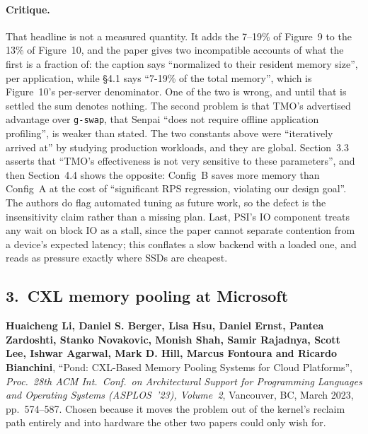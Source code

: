 \paragraph{Critique.}
That headline is not a measured quantity. It adds the 7--19\% of Figure~9 to the 13\% of
Figure~10, and the paper gives two incompatible accounts of what the first is a fraction
of: the caption says ``normalized to their resident memory size'', per application, while
\S4.1 says ``7-19\% of the total memory'', which is Figure~10's per-server denominator.
One of the two is wrong, and until that is settled the sum denotes nothing. The second problem is that TMO's advertised
advantage over \texttt{g-swap}, that Senpai ``does not require offline application
profiling'', is weaker than stated. The two constants above were ``iteratively arrived
at'' by studying production workloads, and they are global. Section~3.3 asserts that
``TMO's effectiveness is not very sensitive to these parameters'', and then Section~4.4
shows the opposite: Config~B saves more memory than Config~A at the cost of
``significant RPS regression, violating our design goal''. The authors do flag automated
tuning as future work, so the defect is the insensitivity claim rather than a missing
plan. Last, PSI's IO component treats any wait on block IO as a stall, since the paper
cannot separate contention from a device's expected latency; this conflates a slow
backend with a loaded one, and reads as pressure exactly where SSDs are cheapest.

\subsection*{3.~CXL memory pooling at Microsoft}

\noindent\textbf{Huaicheng Li, Daniel S. Berger, Lisa Hsu, Daniel Ernst, Pantea
Zardoshti, Stanko Novakovic, Monish Shah, Samir Rajadnya, Scott Lee, Ishwar Agarwal,
Mark D. Hill, Marcus Fontoura and Ricardo Bianchini}, ``Pond: CXL-Based Memory Pooling
Systems for Cloud Platforms'', \emph{Proc.\ 28th ACM Int.\ Conf.\ on Architectural
Support for Programming Languages and Operating Systems (ASPLOS~'23), Volume~2},
Vancouver, BC, March 2023, pp.~574--587. Chosen because it moves the problem out of the
kernel's reclaim path entirely and into hardware the other two papers could only wish
for.

